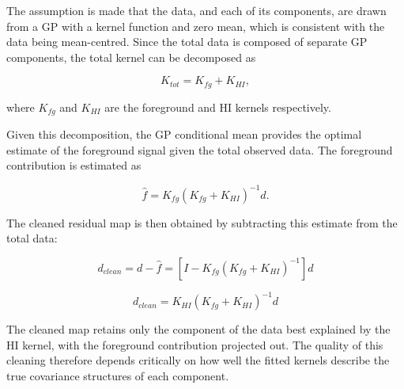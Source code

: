 The assumption is made that the data, and each of its components, are drawn from a GP with a kernel function and zero mean, which is consistent with the data being mean-centred. Since the total data is composed of separate GP components, the total kernel can be decomposed as

\begin{equation}
    K_{tot} = K_{fg}+K_{HI},
\end{equation}

where $K_{fg}$ and $K_{HI}$ are the foreground and HI kernels respectively.

Given this decomposition, the GP conditional mean provides the optimal estimate of the foreground signal given the total observed data. The foreground contribution is estimated as

\begin{equation}
    \hat{f} = K_{fg}(K_{fg}+K_{HI})^{-1}d.
\end{equation}

The cleaned residual map is then obtained by subtracting this estimate from the total data:

\begin{equation}
    d_{clean} = d - \hat{f} = [I - K_{fg}(K_{fg}+K_{HI})^{-1}]d
\end{equation}

\begin{equation}
    d_{clean} = K_{HI}(K_{fg}+K_{HI})^{-1}d
\end{equation}

The cleaned map retains only the component of the data best explained by the HI kernel, with the foreground contribution projected out. The quality of this cleaning therefore depends critically on how well the fitted kernels describe the true covariance structures of each component.



